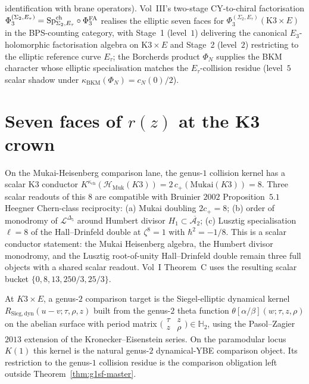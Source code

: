 \begin{remark}
identification with brane operators). Vol~III's
two-stage CY-to-chiral factorisation
$\Phi_3^{(\Sigma_2, E_\tau)} = \mathrm{Sp}^{\mathrm{ch}}_{\Sigma_2, E_\tau} \circ \Phi^{\mathrm{FA}}_3$
realises the elliptic seven faces for
$\Phi_3^{(\Sigma_2,E_\tau)}(\mathrm{K3} \times E)$ in the BPS-counting
category, with Stage~1 (level~$1$) delivering the canonical
$E_3$-holomorphic factorisation algebra on $\mathrm{K3} \times E$ and
Stage~2 (level~$2$) restricting to the elliptic reference curve
$E_\tau$; the Borcherds product $\Phi_N$ supplies the BKM character
whose elliptic specialisation matches the $E_\tau$-collision residue
(level~$5$ scalar shadow under
$\kappa_{\mathrm{BKM}}(\Phi_N)=c_N(0)/2$).
\end{remark}

\section{Seven faces of $r(z)$ at the K3 crown}
\label{sec:g1sf-supplement}

\begin{remark}
\label{rem:g1sf-seven-faces}
On the Mukai-Heisenberg comparison lane, the genus-$1$ collision
kernel has a scalar K3 conductor
$K^{\kappa_{\mathrm{ch}}}(\mathcal{H}_{\mathrm{Muk}}(K3)) = 2\,c_+(\mathrm{Mukai}(K3)) = 8$.
Three scalar readouts of this $8$ are compatible with Bruinier
$2002$ Proposition~$5.1$ Heegner Chern-class reciprocity:
(a) Mukai doubling $2 c_+ = 8$;
(b) order of monodromy of $\mathcal{L}^{\Delta_5}$ around Humbert divisor $H_1 \subset \overline{\mathcal{A}_2}$;
(c) Lusztig specialisation $\ell = 8$ of the Hall--Drinfeld double at $\zeta^8 = 1$ with $\hbar^2 = -1/8$.
This is a scalar conductor statement: the Mukai Heisenberg algebra,
the Humbert divisor monodromy, and the Lusztig root-of-unity
Hall--Drinfeld double remain three full objects with a shared scalar
readout. Vol~I
Theorem~C uses the resulting scalar bucket
$\{0, 8, 13, 250/3, 25/3\}$.
\end{remark}

\begin{remark}
\label{rem:g1sf-R-sieg}
At $K3\times E$, a genus-$2$ comparison target is the
Siegel-elliptic dynamical kernel
$R_{\mathrm{Sieg,dyn}}(u-v;\tau,\rho,z)$ built from the genus-$2$
theta function
$\theta[\alpha/\beta](w;\tau,z,\rho)$ on the abelian surface with
period matrix
$\bigl(\begin{smallmatrix}\tau & z\\ z & \rho\end{smallmatrix}\bigr)
\in\mathbb H_2$, using the Pasol--Zagier $2013$ extension of the
Kronecker--Eisenstein series. On the paramodular locus $K(1)$ this
kernel is the natural genus-$2$ dynamical-YBE comparison object. Its
restriction to the genus-$1$ collision residue is the comparison
obligation left outside Theorem~\ref{thm:g1sf-master}.
\end{remark}

